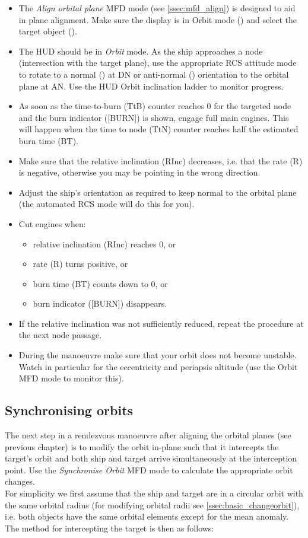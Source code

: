 \documentclass[Orbiter User Manual.tex]{subfiles}
\begin{document}
\begin{itemize}
\item The \textit{Align orbital plane} MFD mode (see \ref{ssec:mfd_align}) is designed to aid in plane alignment. Make sure the display is in Orbit mode (\Shift{}) and select the target object (\Shift{}).
\item The HUD should be in \textit{Orbit} mode. As the ship approaches a node (intersection with the target plane), use the appropriate RCS attitude mode to rotate to a normal (\keystroke{;}) at DN or anti-normal () orientation to the orbital plane at AN. Use the HUD Orbit inclination ladder to monitor progress.
\item As soon as the time-to-burn (TtB) counter reaches 0 for the targeted node and the burn indicator ([BURN]) is shown, engage full main engines. This will happen when the time to node (TtN) counter reaches half the estimated burn time (BT).
\item Make sure that the relative inclination (RInc) decreases, i.e. that the rate (R) is negative, otherwise you may be pointing in the wrong direction.
\item Adjust the ship's orientation as required to keep normal to the orbital plane (the automated RCS mode will do this for you).
\item Cut engines when:

\begin{itemize}
\item relative inclination (RInc) reaches 0, or
\item rate (R) turns positive, or
\item burn time (BT) counts down to 0, or
\item burn indicator ([BURN]) disappears.
\end{itemize}

\item If the relative inclination was not sufficiently reduced, repeat the procedure at the next node passage.
\item During the manoeuvre make sure that your orbit does not become unstable. Watch in particular for the eccentricity and periapsis altitude (use the Orbit MFD mode to monitor this).
\end{itemize}


\subsection{Synchronising orbits}
\label{ssec:basic_sync}
The next step in a rendezvous manoeuvre after aligning the orbital planes (see previous chapter) is to modify the orbit in-plane such that it intercepts the target's orbit and both ship and target arrive simultaneously at the interception point. Use the \textit{Synchronise Orbit} MFD mode to calculate the appropriate orbit changes.\\
For simplicity we first assume that the ship and target are in a circular orbit with the same orbital radius (for modifying orbital radii see \ref{ssec:basic_changeorbit}), i.e. both objects have the same orbital elements except for the mean anomaly. The method for intercepting the target is then as follows:
\end{document}
